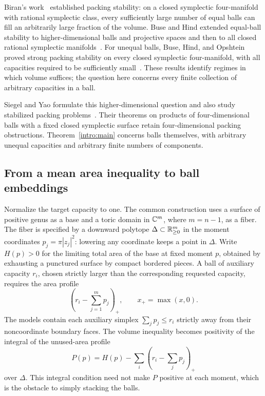 Biran's work~\cite{Biran1997,Biran1999} established packing stability:
on a closed symplectic four-manifold with rational symplectic class,
every sufficiently large number of equal balls can fill an arbitrarily
large fraction of the volume. Buse and Hind extended equal-ball
stability to higher-dimensional balls and projective spaces and then to all closed
rational symplectic manifolds~\cite{BuseHind2011,BuseHind2013}.
For unequal balls, Buse, Hind, and Opshtein proved strong packing
stability on every closed symplectic four-manifold, with all capacities
required to be sufficiently small~\cite{BuseHindOpshtein2016}.
These results identify regimes in which volume suffices; the question
here concerns every finite collection of arbitrary capacities in a ball.

Siegel and Yao formulate this higher-dimensional question and also study
stabilized packing problems~\cite{SiegelYao2025}. Their theorems on
products of four-dimensional balls with a fixed closed symplectic surface
retain four-dimensional packing obstructions. Theorem~\ref{intro:main}
concerns balls themselves, with arbitrary unequal capacities and
arbitrary finite numbers of components.

\subsection{From a mean area inequality to ball embeddings}

Normalize the target capacity to one. The common construction uses a
surface of positive genus as a base and a toric domain in \(\mathbb C^m\),
where \(m=n-1\), as a fiber. The fiber is specified by a downward
polytope \(\Delta\subset\mathbb R_{\ge0}^m\) in the moment coordinates
\(p_j=\pi|z_j|^2\): lowering any coordinate keeps a point in
\(\Delta\). Write \(H(p)>0\) for the limiting total area of the
base at fixed moment \(p\), obtained by exhausting a punctured
surface by compact bordered pieces. A ball of auxiliary capacity
\(r_i\), chosen strictly larger than the corresponding requested
capacity, requires the area profile
\[
\left(r_i-\sum_{j=1}^m p_j\right)_+,
 \qquad x_+=\max(x,0).
\]
The models contain each auxiliary simplex \(\sum_jp_j\le r_i\)
strictly away from their noncoordinate boundary faces.
The volume inequality becomes positivity of the integral of the
unused-area profile
\[
 P(p)=H(p)-\sum_i\left(r_i-\sum_jp_j\right)_+
\]
over \(\Delta\). This integral condition need not make \(P\) positive
at each moment, which is the obstacle to simply stacking the balls.


